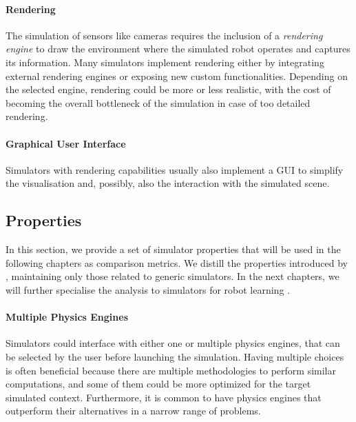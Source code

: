 \begin{addmargin}{0cm}
\paragraph{Rendering}

The simulation of sensors like cameras requires the inclusion of a \emph{rendering engine} to draw the environment where the simulated robot operates and captures its information.
Many simulators implement rendering either by integrating external rendering engines or exposing new custom functionalities.
Depending on the selected engine, rendering could be more or less realistic, with the cost of becoming the overall bottleneck of the simulation in case of too detailed rendering.

\end{addmargin}

\paragraph{Graphical User Interface}

Simulators with rendering capabilities usually also implement a \ac{GUI} to simplify the visualisation and, possibly, also the interaction with the simulated scene.

\subsection{Properties}
\label{sec:simulator_properties}

In this section, we provide a set of simulator properties that will be used in the following chapters as comparison metrics.
We distill the properties introduced by \textcite{ferigo_gym-ignition_2020}, maintaining only those related to generic simulators.
In the next chapters, we will further specialise the analysis to simulators for robot learning .

\paragraph{Multiple Physics Engines}

Simulators could interface with either one or multiple physics engines, that can be selected by the user before launching the simulation.
Having multiple choices is often beneficial because there are multiple methodologies to perform similar computations, and some of them could be more optimized for the target simulated context.
Furthermore, it is common to have physics engines that outperform their alternatives in a narrow range of problems.

